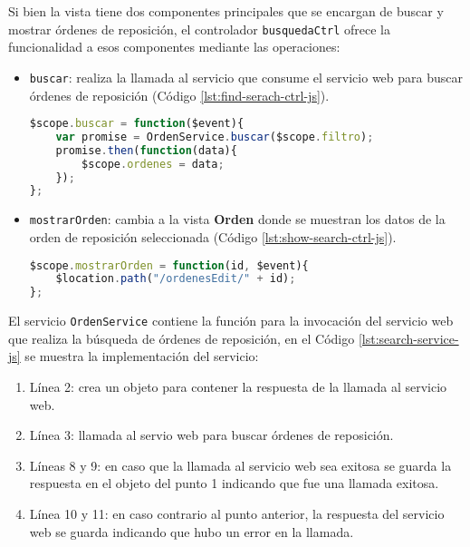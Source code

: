 Si bien la vista tiene dos componentes principales que se encargan de buscar y mostrar órdenes de reposición, el controlador \texttt{busquedaCtrl} ofrece la funcionalidad a esos componentes mediante las operaciones:
\begin{itemize}
	\item \texttt{buscar}: realiza la llamada al servicio que consume el servicio web para buscar órdenes de reposición (Código \ref{lst:find-serach-ctrl-js}).
\begin{lstlisting}[language=Javascript, caption={Función para llamar el servicio de búsqueda de órdenes de reposición.}, captionpos=b, label={lst:find-serach-ctrl-js}]
$scope.buscar = function($event){
	var promise = OrdenService.buscar($scope.filtro);
	promise.then(function(data){
		$scope.ordenes = data;
	});
};
\end{lstlisting}

	\item \texttt{mostrarOrden}: cambia a la vista \textbf{Orden} donde se muestran los datos de la orden de reposición seleccionada (Código \ref{lst:show-search-ctrl-js}).
\begin{lstlisting}[language=Javascript, caption={Función para mostrar la vista de una orden de reposición.}, captionpos=b, label={lst:show-search-ctrl-js}]
$scope.mostrarOrden = function(id, $event){
	$location.path("/ordenesEdit/" + id);
};
\end{lstlisting}
\end{itemize}

El servicio \texttt{OrdenService} contiene la función para la invocación del servicio web que realiza la búsqueda de órdenes de reposición, en el Código \ref{lst:search-service-js} se muestra la implementación del servicio:
\begin{enumerate}
	\item Línea 2: crea un objeto para contener la respuesta de la llamada al servicio web.
	\item Línea 3: llamada al servio web para buscar órdenes de reposición.
	\item Líneas 8 y 9: en caso que la llamada al servicio web sea exitosa se guarda la respuesta en el objeto del punto 1 indicando que fue una llamada exitosa.
	\item Línea 10 y 11: en caso contrario al punto anterior, la respuesta del servicio web se guarda indicando que hubo un error en la llamada.
\end{enumerate}


\pagebreak

